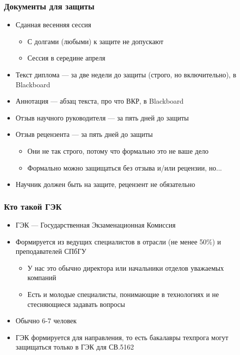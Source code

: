 \documentclass[xetex,mathserif,serif]{beamer}
\begin{document}
    \begin{frame}
        \frametitle{Документы для защиты}
        \begin{itemize}
            \item Сданная весенняя сессия
            \begin{itemize}
                \item С долгами (любыми) к защите не допускают
                \item Сессия в середине апреля
            \end{itemize}
            \item Текст диплома --- за две недели до защиты (строго, но включительно), в Blackboard
            \item Аннотация --- абзац текста, про что ВКР, в Blackboard
            \item Отзыв научного руководителя --- за пять дней до защиты
            \item Отзыв рецензента --- за пять дней до защиты
            \begin{itemize}
                \item Они не так строго, потому что формально это не ваше дело
                \item Формально можно защищаться без отзыва и/или рецензии, но...
            \end{itemize}
            \item Научник должен быть на защите, рецензент не обязательно
        \end{itemize}
    \end{frame}

    \begin{frame}
        \frametitle{Кто такой ГЭК}
        \begin{itemize}
            \item ГЭК --- Государственная Экзаменационная Комиссия
            \item Формируется из ведущих специалистов в отрасли (не менее 50\%) и преподавателей СПбГУ
            \begin{itemize}
                \item У нас это обычно директора или начальники отделов уважаемых компаний
                \item Есть и молодые специалисты, понимающие в технологиях и не стесняющиеся задавать вопросы
            \end{itemize}
            \item Обычно 6-7 человек
            \item ГЭК формируется для направления, то есть бакалавры техпрога могут защищаться только в ГЭК для СВ.5162
        \end{itemize}
    \end{frame}
\end{document}
